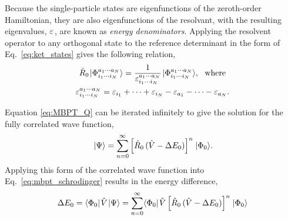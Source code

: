 \documentclass[thesis.tex]{subfiles}
\begin{document}
Because the single-particle states are eigenfunctions of the zeroth-order Hamiltonian, they are also eigenfunctions of the resolvant, with the resulting eigenvalues, $\varepsilon^{}_{}$, are known as \textit{energy denominators}.  Applying the resolvent operator to any orthogonal state to the reference determinant in the form of Eq.\ \eqref{eq:ket_states} gives the following relation,
\begin{gather} \label{eq:energy_denominators}
  \hat{R}_{0}\hspace{1pt}\lvert \Phi^{a_{1}\cdots a_{N}}_{i_{1}\cdots i_{N}} \rangle = \frac{1}{\varepsilon^{a_{1}\cdots a_{N}}_{i_{1}\cdots i_{N}}}\hspace{1pt}\lvert \Phi^{a_{1}\cdots a_{N}}_{i_{1}\cdots i_{N}} \rangle,\ \ \text{where} \notag \\
  \varepsilon^{a_{1}\cdots a_{N}}_{i_{1}\cdots i_{N}} = \varepsilon_{i_{1}} + \cdots + \varepsilon_{i_{N}} - \varepsilon_{a_{1}} - \cdots - \varepsilon_{a_{N}}.
\end{gather}

Equation \eqref{eq:MBPT_Q} can be iterated infinitely to give the solution for the fully correlated wave function,
\begin{equation} \label{eq:MBPT_wave1}
  \hspace{1pt}\lvert \Psi \rangle = \sum_{n=0}^{\infty}\left[\hat{R}_{0}\mathop{(\hat{V} - \Delta E_{0})}\right]^{n}\hspace{1pt}\lvert \Phi_{0} \rangle.
\end{equation}
Applying this form of the correlated wave function into Eq.\ \eqref{eq:mbpt_schrodinger} results in the energy difference,
\begin{equation} \label{eq:MBPT_energy1}
  \Delta E_{0} = \langle \Phi_{0} |\hspace{1pt}\hat{V}\hspace{1pt}\lvert \Psi \rangle = \sum_{n=0}^{\infty}\langle \Phi_{0} |\hspace{1pt}\hat{V}\left[\hat{R}_{0}\mathop{(\hat{V} - \Delta E_{0})}\right]^{n}\hspace{1pt}\lvert \Phi_{0} \rangle
\end{equation}
\end{document}
